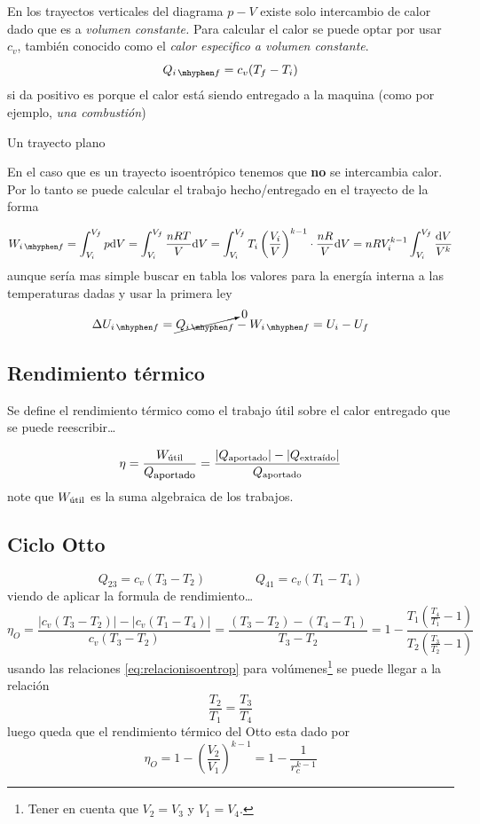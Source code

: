 \documentclass{article}
\newcommand{\ctegas}{k}
\newcommand{\inicial}{i}
\newcommand{\final}{f}
\newcommand{\rc}{r_c}
\newcommand{\util}{{\textrm{útil}}}
\newcommand{\Wutil}{W_{ \footnotesize \util}}
\newcommand{\di}{\textrm{d}}
\newcommand{\hyph}{\,\mhyphen}
\begin{document}
En los trayectos verticales del diagrama $p-V$ existe solo intercambio de calor dado que es a \textit{volumen constante.} Para calcular el calor se puede optar por usar $c_v$, también conocido como el \textit{calor especifico a volumen constante}.
\[
Q_{\inicial\hyph\final} = c_v (T_\final - T_\inicial)
\]
si da positivo es porque el calor está siendo entregado a la maquina (como por ejemplo,\textit{ una combustión})

Un trayecto plano


En el caso que es un trayecto isoentrópico tenemos que \textbf{no} se intercambia calor. Por lo tanto se puede calcular el trabajo hecho/entregado en el trayecto de la forma

\[
W_{\inicial\hyph\final}=\int_{V_\inicial}^{V_\final}p \di V =\int_{V_\inicial}^{V_\final} \frac{nRT}{V} \di V =\int_{V_\inicial}^{V_\final} T_\inicial\left( \frac{V_\inicial}{V} \right)^{\ctegas-1}\cdot\frac{nR}{V} \di V =nRV_\inicial^{\ctegas-1}  \int_{V_\inicial}^{V_\final} \frac{\di V}{V^\ctegas}
\]
aunque sería mas simple buscar en tabla los valores para la energía interna a las temperaturas dadas y usar la primera ley
\[
\Delta U_{\inicial \hyph \final}= \cancelto{0}{Q_{\inicial\hyph \final}} - W_{\inicial\hyph \final} = U_{\inicial}-U_{\final}
\]
\subsection{Rendimiento térmico}
Se define el rendimiento térmico como el trabajo útil sobre el calor entregado que se puede reescribir\ldots

\[
\eta = \frac{W_{ \footnotesize \util}}{Q_{\textrm{\footnotesize aportado}}}=\frac{|Q_{\footnotesize\textrm{aportado}}|-|Q_{\footnotesize\textrm{extraído}}|}{Q_{\footnotesize\textrm{aportado}}}
\]
note que $\Wutil$ es la suma algebraica de los trabajos.

\subsection{Ciclo Otto}
\[ 
Q_{23}=c_v(T_3-T_2) \qquad \qquad Q_{41}=c_v(T_1-T_4)
\]
viendo de aplicar la formula de rendimiento\ldots
\[
\eta_O=\frac{|c_v(T_3-T_2)|-|c_v(T_1-T_4)|}{c_v(T_3-T_2)}=\frac{(T_3-T_2)-(T_4-T_1)}{T_3-T_2}=1-\frac{T_1\left(\frac{T_4}{T_1}-1\right)}{T_2 \left( \frac{T_3}{T_2}-1\right)}
\]
usando las relaciones \eqref{eq:relacionisoentrop} para volúmenes\footnote{Tener en cuenta que $V_2=V_3$ y $V_1=V_4$.} se puede llegar a la relación 
\[
\frac{T_2}{T_1} = \frac{T_3}{T_4}
\]
luego queda que el rendimiento térmico del Otto esta dado por
\begin{equation}
    \eta_O=1-\left(\frac{V_2}{V_1}\right)^{\ctegas-1}=1-\frac{1}{\rc^{\ctegas-1}}
\end{equation}
\end{document}
